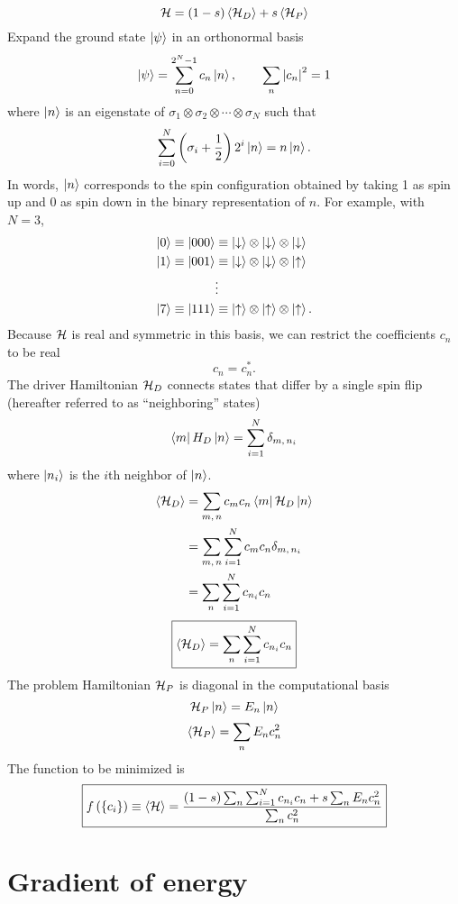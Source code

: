 \begin{equation}
  \mathcal{H} = (1 - s) \left< \mathcal{H}_D \right> + s \left< \mathcal{H}_P \right>
  \label{}
\end{equation}
Expand the ground state $\left| \psi \right>$ in an orthonormal basis
\begin{equation}
  \left| \psi \right> = \sum_{n=0}^{2^N-1} c_n \left| n \right>,
  \qquad
  \sum_n \left| c_n \right|^2 = 1
  \label{}
\end{equation}
where $\left| n \right>$ is an eigenstate of
$\sigma_1 \otimes \sigma_2 \otimes \cdots \otimes \sigma_N$
such that
\begin{equation}
    \sum_{i=0}^N \left( \sigma_i + \frac{1}{2} \right) 2^i \left| n \right> = n \left| n \right>.
  \label{}
\end{equation}
In words, $\left| n \right>$ corresponds to the spin configuration obtained by taking 1
as spin up and 0 as spin down in the binary representation of $n$.
For example, with $N=3$,
\begin{align*}
  \left| 0 \right> \equiv \left| 000 \right>
  &\equiv
  \left| \downarrow \right> \otimes
  \left| \downarrow \right> \otimes
  \left| \downarrow \right> \\
  \left| 1 \right> \equiv \left| 001 \right>
  &\equiv
  \left| \downarrow \right> \otimes
  \left| \downarrow \right> \otimes
  \left| \uparrow \right> \\
  &\vdots \\
  \left| 7 \right> \equiv \left| 111 \right>
  &\equiv
  \left| \uparrow \right> \otimes
  \left| \uparrow \right> \otimes
  \left| \uparrow \right>.
  \label{}
\end{align*}
Because $\mathcal{H}$ is real and symmetric in this basis, we can restrict the
coefficients $c_n$ to be real
\begin{equation}
  c_n = c_n^*.
  \label{}
\end{equation}
The driver Hamiltonian $\mathcal{H}_D$ connects states that differ by a single spin
flip (hereafter referred to as ``neighboring'' states)
\begin{equation}
  \matrixel{m}{H_D}{n} = \sum_{i=1}^N \delta_{m,\, n_i}
  \label{}
\end{equation}
where $\left| n_i \right>$ is the $i$th neighbor of $\left| n \right>$.
\begin{align}
  \avg{\ham_D}
  &= \sum_{m,\,n} c_m c_n \matrixel{m}{\ham_D}{n} \\
  &= \sum_{m,\,n} \sum_{i=1}^N c_m c_n \delta_{m,\, n_i} \\
  &= \sum_n \sum_{i=1}^N c_{n_i} c_n
  \label{}
\end{align}
\begin{equation}
  \boxed{
  \left< \mathcal{H}_D \right> = \sum_n \sum_{i=1}^N c_{n_i} c_n
  }
  \label{}
\end{equation}
The problem Hamiltonian $\mathcal{H}_P$ is diagonal in the computational basis
\begin{equation}
  \mathcal{H}_P \left| n \right> = E_n \left| n \right>
  \label{}
\end{equation}
\begin{equation}
  \left< \mathcal{H}_P \right> = \sum_n E_n c_n^2
  \label{}
\end{equation}
The function to be minimized is
\begin{equation}
  \boxed{
  f \left( \left\{ c_i \right\} \right)
  \equiv \left< \mathcal{H} \right>
  = \frac{(1-s) \sum_n \sum_{i=1}^N c_{n_i} c_n + s \sum_n E_n c_n^2}
  {\sum_n c_n^2}
  }
  \label{}
\end{equation}
\section*{Gradient of energy}


